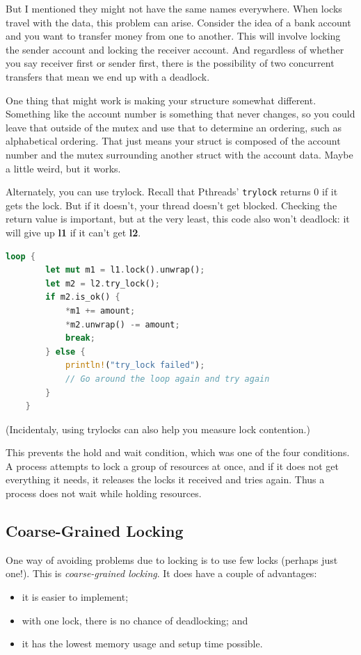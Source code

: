 \documentclass[a4paper]{report}
\begin{document}
But I mentioned they might not have the same names everywhere. When locks travel with the data, this problem can arise. Consider the idea of a bank account and you want to transfer money from one to another. This will involve locking the sender account and locking the receiver account. And regardless of whether you say receiver first or sender first, there is the possibility of two concurrent transfers that mean we end up with a deadlock.

One thing that might work is making your structure somewhat different. Something like the account number is something that never changes, so you could leave that outside of the mutex and use that to determine an ordering, such as alphabetical ordering. That just means your struct is composed of the account number and the mutex surrounding another struct with the account data. Maybe a little weird, but it works.

Alternately, you can use trylock. Recall that Pthreads' {\tt trylock}
returns 0 if it gets the lock. But if it doesn't, your thread doesn't get blocked. Checking the return value is important, but at the very least, this code also won't deadlock: it will give up {\bf l1} if it can't get {\bf l2}.
  \begin{lstlisting}[language=Rust]
    loop {
        let mut m1 = l1.lock().unwrap();
        let m2 = l2.try_lock();
        if m2.is_ok() {
            *m1 += amount;
            *m2.unwrap() -= amount;
            break;
        } else {
            println!("try_lock failed");
            // Go around the loop again and try again
        }
    }
  \end{lstlisting}
  (Incidentaly, using trylocks can also help you measure lock contention.)

This prevents the hold and wait condition, which was one of the four conditions. A process attempts to lock a group of resources at once, and if it does not get everything it needs, it releases the locks it received and tries again. Thus a process does not wait while holding resources.

\subsection*{Coarse-Grained Locking}
One way of avoiding problems due to locking is to use few locks
(perhaps just one!). This is \emph{coarse-grained locking}.
It does have a couple of advantages:
  \begin{itemize}
    \item it is easier to implement;
    \item with one lock, there is no chance of deadlocking; and
    \item it has the lowest memory usage and setup time possible.
  \end{itemize}
\end{document}
